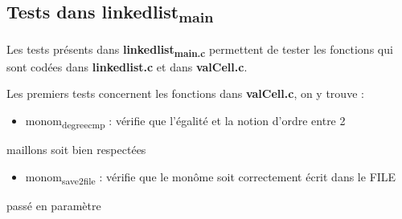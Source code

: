 \documentclass[11pt]{article}
\begin{document}
\subsection{Tests dans linkedlist\textsubscript{main}}
\label{sec:org1e617ac}

Les tests présents dans \textbf{linkedlist\textsubscript{main.c}} permettent de tester les fonctions qui
sont codées dans \textbf{linkedlist.c} et dans \textbf{valCell.c}.

Les premiers tests concernent les fonctions dans \textbf{valCell.c}, on y trouve :
\begin{itemize}
\item monom\textsubscript{degree}\textsubscript{cmp} : vérifie que l'égalité et la notion d'ordre entre 2
\end{itemize}
maillons soit bien respectées
\begin{itemize}
\item monom\textsubscript{save2file} : vérifie que le monôme soit correctement écrit dans le FILE
\end{itemize}
passé en paramètre
\end{document}

